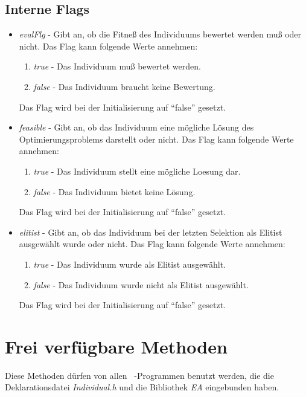 \documentclass{report}
\begin{document}
\subsection{Interne Flags}
\begin{itemize}

\item {\em evalFlg} -
Gibt an, ob die Fitne{\ss} des Individuums bewertet werden
mu{\ss} oder nicht. Das Flag kann folgende Werte annehmen:
\begin{enumerate}
\item {\em true} - Das Individuum mu{\ss} bewertet werden.
\item {\em false} - Das Individuum braucht keine Bewertung. 
\end{enumerate}
Das Flag wird bei der Initialisierung auf ``false'' gesetzt.

\item {\em feasible} -
Gibt an, ob das Individuum eine m\"ogliche L\"osung 
des Optimierungsproblems darstellt oder nicht. Das Flag kann folgende
Werte annehmen:
\begin{enumerate}
\item {\em true} - Das Individuum stellt eine m\"ogliche Loesung dar.
\item {\em false} - Das Individuum bietet keine L\"osung.
\end{enumerate}
Das Flag wird bei der Initialisierung auf ``false'' gesetzt.

\item {\em elitist} -
Gibt an, ob das Individuum bei der letzten Selektion als 
Elitist ausgew\"ahlt wurde oder nicht. Das Flag kann folgende Werte
annehmen:
\begin{enumerate}
\item {\em true} - Das Individuum wurde als Elitist ausgew\"ahlt.
\item {\em false} - Das Individuum wurde nicht als Elitist ausgew\"ahlt.
\end{enumerate}
Das Flag wird bei der Initialisierung auf ``false'' gesetzt.

\end{itemize}

\section{Frei verf\"ugbare Methoden}
Diese Methoden d\"urfen von allen \cpp\ -Programmen benutzt werden, die
die Deklarationsdatei {\em Individual.h} und
die Bibliothek {\em EA} eingebunden haben.
\end{document}
